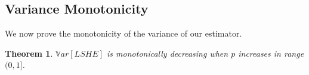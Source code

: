 \documentclass[aoas]{imsart}
\newtheorem{theorem}{Theorem}
\begin{document}
%

\vspace*{4em}
\subsection{Variance Monotonicity}
\label{mo}
We now prove the monotonicity of the variance of our estimator.
\begin{theorem}
	\label{thm}
	$\mathbb{V}ar[LSHE]$ is monotonically decreasing when $p$ increases in  range $(0,1]$.
\end{theorem}
\end{document}

